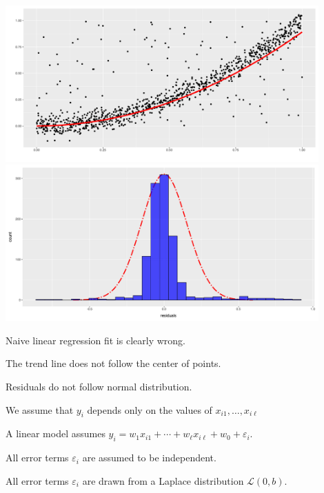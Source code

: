 \documentclass[landscape,footrule]{foils}
\begin{document}

\centerline{
\includegraphics[height=6cm]{naive_fit}\hspace*{1cm}
\includegraphics[height=6cm]{naive_fit_residuals}}

Naive linear regression fit is clearly wrong. 

\begin{triangles}
\item The trend line does not follow the center of points.
\item Residuals do not follow normal distribution. 
\end{triangles}




\begin{triangles}
\item We assume that $y_i$ depends only on the values of $x_{i1}, \ldots, x_{i\ell}$ 
\item A linear model assumes $y_{i}=w_{1}x_{i1}+\cdots+ w_\ell x_{i\ell}+ w_{0}+\varepsilon_i$.
\item All error terms $\varepsilon_i$ are assumed to be independent.
\item  All error terms $\varepsilon_i$ are drawn from a Laplace distribution $\mathcal{L}(0,b)$.
\end{triangles}
\end{document}
